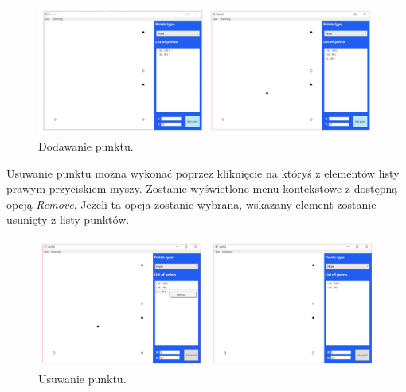 \documentclass[10pt,a4paper]{article}
\begin{document}
	\begin{figure}[H]
		\centering	
		\includegraphics[scale=0.3]{images/add.png}
 		\caption{Dodawanie punktu.}
 		\label{fig:algorithm_diagram}
	\end{figure}	

	Usuwanie punktu można wykonać poprzez kliknięcie na któryś z elementów listy prawym przyciskiem myszy. Zostanie wyświetlone menu kontekstowe z dostępną opcją \textit{Remove}. Jeżeli ta opcja zostanie wybrana, wskazany element zostanie usunięty z listy punktów.
		
	\begin{figure}[H]
		\centering
 		\includegraphics[scale=0.3]{images/remove.png}
 		\caption{Usuwanie punktu.}
 		\label{fig:algorithm_diagram}
	\end{figure}
\end{document}
